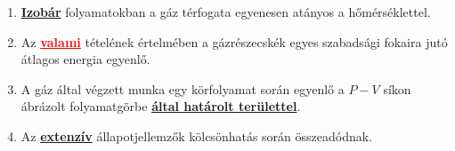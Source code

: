 \documentclass[../../fizika_kerdesek.tex]{subfiles}
\begin{document}
{\begin{enumerate}
                \item \underline{\textbf{Izobár}} folyamatokban a gáz térfogata egyenesen atányos a hőmérséklettel.
                \item Az \textcolor{red}{\underline{\textbf{valami}}} tételének értelmében a gázrészecskék egyes szabadsági fokaira jutó átlagos energia egyenlő.
                \item A gáz által végzett munka egy körfolyamat során egyenlő a $P-V$ síkon ábrázolt folyamatgörbe \underline{\textbf{által határolt területtel}}.
                \item Az \underline{\textbf{extenzív}} állapotjellemzők kölcsönhatás során összeadódnak.
            \end{enumerate}}

    \underline{\textbf{}}
\end{document}
